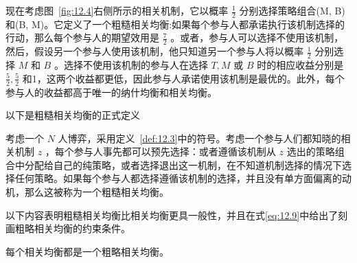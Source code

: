 现在考虑图~\ref{fig:12.4}右侧所示的相关机制，它以概率 \(\frac{1}{2}\) 分别选择策略组合(M, B)和(B, M)。它定义了一个粗糙相关均衡:如果每个参与人都承诺执行该机制选择的行动，那么每个参与人的期望效用是 \(\frac{7}{2}\) 。或者，参与人可以选择不使用该机制，然后，假设另一个参与人使用该机制，他只知道另一个参与人将以概率 \(\frac{1}{2}\) 分别选择 \(M\) 和 \(B\) 。选择不使用该机制的参与人在选择 \(T,M\) 或 \(B\) 时的相应收益分别是 \(\frac{5}{2},\frac{5}{2}\) 和1，这两个收益都更低，因此参与人承诺使用该机制是最优的。此外，每个参与人的收益都高于唯一的纳什均衡和相关均衡。

以下是粗糙相关均衡的正式定义

\begin{definition}\label{def:12.6}
考虑一个 \(N\) 人博弈，采用定义~\ref{def:12.3}中的符号。考虑一个参与人们都知晓的相关机制 \(z\) ，每个参与人事先都可以预先选择：或者遵循该机制从 \(z\) 选出的策略组合中分配给自己的纯策略，或者选择退出这一机制，在不知道机制选择的情况下选择任何策略。如果每个参与人都选择遵循该机制的选择，并且没有单方面偏离的动机，那么这被称为一个粗糙相关均衡。
\end{definition}

以下内容表明粗糙相关均衡比相关均衡更具一般性，并且在式\eqref{eq:12.9}中给出了刻画粗略相关均衡的约束条件。

\begin{proposition}\label{prop:12.7}
每个相关均衡都是一个粗略相关均衡。
\end{proposition}

